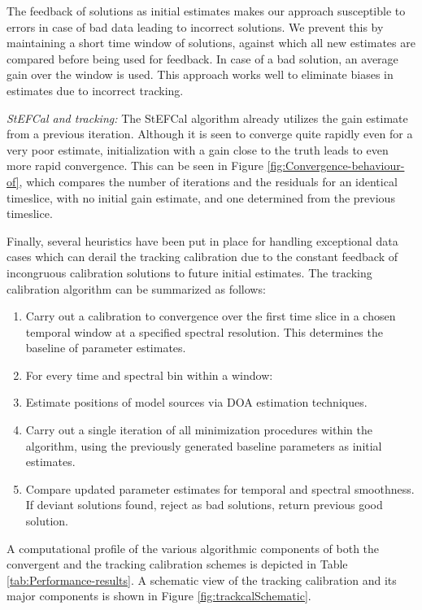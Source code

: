 \documentclass{aa}
\begin{document}
The feedback of solutions as initial estimates makes our approach susceptible to
errors in case  of bad data leading to incorrect solutions.   We prevent this by
maintaining a  short time window of  solutions, against which  all new estimates
are compared  before being  used for feedback.   In case  of a bad  solution, an
average gain  over the window  is used.  This  approach works well  to eliminate
biases in estimates due to incorrect tracking.

\emph{StEFCal  and tracking: }The  StEFCal algorithm  already utilizes  the gain
estimate  from a  previous  iteration. Although  it  is seen  to converge  quite
rapidly even for  a very poor estimate, initialization with a  gain close to the
truth  leads  to even  more  rapid  convergence.  This  can  be  seen in  Figure
\ref{fig:Convergence-behaviour-of}, which compares  the number of iterations and
the residuals for an identical timeslice, with no initial gain estimate, and one
determined from the previous timeslice.

Finally, several heuristics have been put in place for handling exceptional data
cases which can derail the tracking  calibration due to the constant feedback of
incongruous  calibration solutions  to future  initial estimates.   The tracking
calibration algorithm can be summarized as follows:
\begin{enumerate}
\item Carry  out a  calibration to convergence  over the  first time slice  in a
  chosen temporal window at a specified spectral resolution. This determines the
  baseline of parameter estimates.
\item For every time and spectral bin within a window:
\item Estimate positions of model sources via DOA estimation techniques.
\item Carry  out a  single iteration of  all minimization procedures  within the
  algorithm,  using  the previously  generated  baseline  parameters as  initial
  estimates.
\item Compare updated parameter  estimates for temporal and spectral smoothness.
  If  deviant solutions  found, reject  as bad  solutions, return  previous good
  solution.
\end{enumerate}
A  computational profile  of  the  various algorithmic  components  of both  the
convergent  and   the  tracking  calibration   schemes  is  depicted   in  Table
\ref{tab:Performance-results}. A  schematic view of  the tracking calibration  and its
major          components          is          shown          in          Figure
\textcolor{black}{\ref{fig:trackcalSchematic}.}
\end{document}
